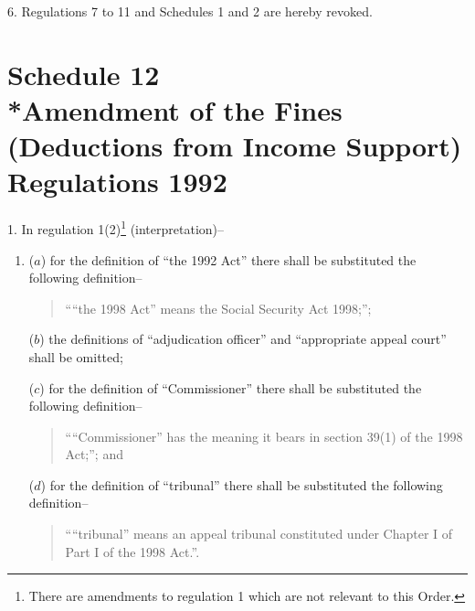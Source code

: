 \documentclass[12pt,a4paper]{article}
\begin{document}
\medskip

6.  Regulations 7 to 11 and Schedules 1 and 2 are hereby revoked.

\part[Schedule 12 --- Amendment of the Fines (Deductions from Income Support) Regulations 1992]{Schedule 12\\*Amendment of the Fines (Deductions from Income Support) Regulations 1992}

\renewcommand\parthead{--- Schedule 12}

1.  In regulation 1(2)\footnote{\frenchspacing There are amendments to regulation 1 which are not relevant to this Order.} (interpretation)–
\begin{enumerate}\item[]
($a$) for the definition of “the 1992 Act” there shall be substituted the following definition–
\begin{quotation}
““the 1998 Act” means the Social Security Act 1998;”;
\end{quotation}

($b$) the definitions of “adjudication officer” and “appropriate appeal court” shall be omitted;

($c$) for the definition of “Commissioner” there shall be substituted the following definition–
\begin{quotation}
    ““Commissioner” has the meaning it bears in section 39(1) of the 1998 Act;”; and 
\end{quotation}

($d$) for the definition of “tribunal” there shall be substituted the following definition–
\begin{quotation}
““tribunal” means an appeal tribunal constituted under Chapter I of Part I of the 1998 Act.”.
\end{quotation}
\end{enumerate}

\medskip
\end{document}
